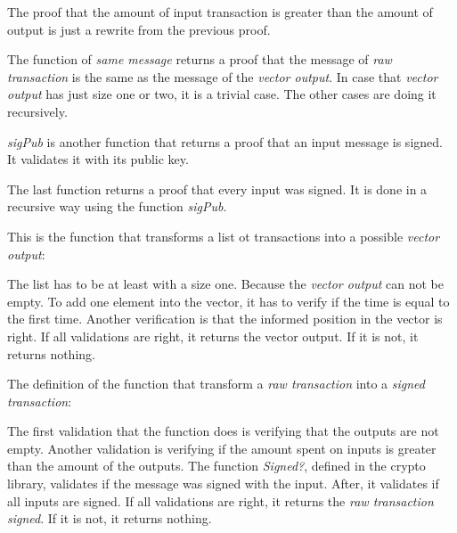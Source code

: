 The proof that the amount of input transaction is greater than the amount of output
is just a rewrite from the previous proof.

The function of \emph{same message} returns a proof that the message of \emph{raw transaction}
is the same as the message of the \emph{vector output}.
In case that \emph{vector output} has just size one or two, it is a trivial case.
The other cases are doing it recursively.

\emph{sigPub} is another function that returns a proof that an input message is signed.
It validates it with its public key.

The last function returns a proof that every input was signed.
It is done in a recursive way using the function \emph{sigPub}.

This is the function that transforms a list ot transactions into a possible \emph{vector output}:


The list has to be at least with a size one.
Because the \emph{vector output} can not be empty.
To add one element into the vector, it has to verify if the time is equal to the first time.
Another verification is that the informed position in the vector is right.
If all validations are right, it returns the vector output.
If it is not, it returns nothing.

The definition of the function that transform a \emph{raw transaction} into a
\emph{signed transaction}:


The first validation that the function does is verifying that the outputs are not empty.
Another validation is verifying if the amount spent on inputs is greater than the amount of the outputs.
The function \emph{Signed?}, defined in the crypto library, validates if the
message was signed with the input.
After, it validates if all inputs are signed.
If all validations are right, it returns the \emph{raw transaction signed}.
If it is not, it returns nothing.
